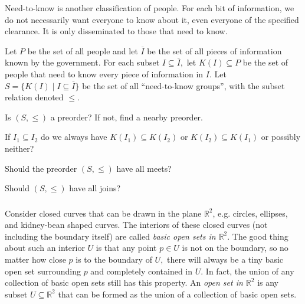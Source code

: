 \documentclass[../main/CT4S-EN-RU]{subfiles}
\begin{document}
\begin{blockENG}
Need-to-know is another classification of people. For each bit of information, we do not necessarily want everyone to know about it, even everyone of the specified clearance. It is only disseminated to those that need to know. 
\end{blockENG}

\begin{blockRUS}
\end{blockRUS}

\begin{exerciseENG}
Let $P$ be the set of all people and let $\overline{I}$ be the set of all pieces of information known by the government. For each subset $I\subseteq\overline{I},$ let $K(I)\subseteq P$ be the set of people that need to know every piece of information in $I.$ Let $S=\{K(I){\;|\;}I\subseteq\overline{I}\}$ be the set of all “need-to-know groups”, with the subset relation denoted $\leq.$ 

\sexc Is $(S,\leq)$ a preorder? If not, find a nearby preorder. 
\item If $I_1\subseteq I_2$ do we always have $K(I_1)\subseteq K(I_2)$ or $K(I_2)\subseteq K(I_1)$ or possibly neither? 
\item Should the preorder $(S,\leq)$ have all meets? 
\item Should $(S,\leq)$ have all joins?
\endsexc
\end{exerciseENG}

\begin{exerciseRUS}
\end{exerciseRUS}


\subsubsection{}

\begin{blockENG}
Consider closed curves that can be drawn in the plane ${ℝ}^2$, e.g. circles, ellipses, and kidney-bean shaped curves. The interiors of these closed curves (not including the boundary itself) are called {\em basic open sets in ${ℝ}^2$}. The good thing about such an interior $U$ is that any point $p\in U$ is not on the boundary, so no matter how close $p$ is to the boundary of $U,$ there will always be a tiny basic open set surrounding $p$ and completely contained in $U.$ In fact, the union of any collection of basic open sets still has this property. An {\em open set in ${ℝ}^2$} is any subset $U\subseteq {ℝ}^2$ that can be formed as the union of a collection of basic open sets.
\end{blockENG}
\end{document}
